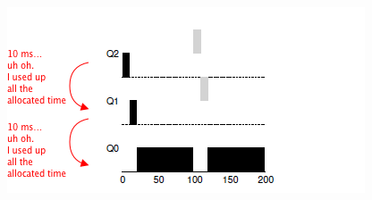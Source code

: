 \documentclass[12pt]{article}
\begin{document}
\begin{enumerate}[1.]
\begin{itemize}
\begin{itemize}
            \begin{center}
            \includegraphics[width=0.8\linewidth]{images/worksheet_5_solution_2.png}
            \end{center}
        \end{itemize}


    \end{itemize}
\end{enumerate}
\end{document}
